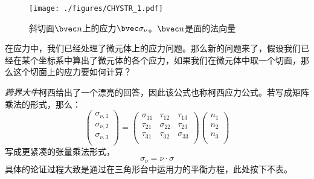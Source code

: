 

\begin{figure}[ht]
\centering
\texttt{[image: ./figures/CHYSTR\_1.pdf]}
\caption{斜切面$\bvec n$上的应力$\bvec \sigma_\nu$。$\bvec n$是面的法向量} \label{CHYSTR_fig1}
\end{figure}

在应力中，我们已经处理了微元体上的应力问题。那么新的问题来了，假设我们已经在某个坐标系中算出了微元体的各个应力，如果我们在微元体中取一个切面，那么这个切面上的应力要如何计算？

\textsl{跨界大牛}柯西给出了一个漂亮的回答，因此该公式也称柯西应力公式。若写成矩阵乘法的形式，那么：
\begin{equation}
\begin{pmatrix}
\sigma_{\nu,1}\\
\sigma_{\nu,2}\\
\sigma_{\nu,3}\\
\end{pmatrix}
=
\begin{pmatrix}
\sigma_{11} & \tau_{12} & \tau_{13} \\
\tau_{21} & \sigma_{22} & \tau_{23} \\
\tau_{31} & \tau_{32} & \sigma_{33} \\
\end{pmatrix}
\begin{pmatrix}
n_1\\
n_2\\
n_3\\
\end{pmatrix}
\end{equation}
写成更紧凑的张量乘法形式，
\begin{equation}
\sigma_\nu = \nu \cdot \sigma
\end{equation}
具体的论证过程大致是通过在三角形台中运用力的平衡方程，此处按下不表。

